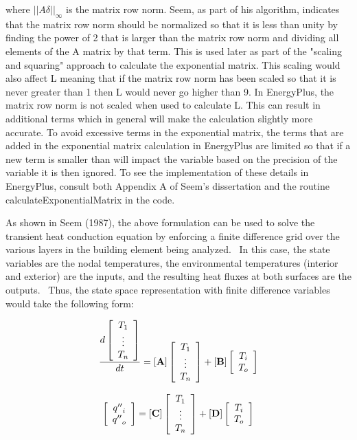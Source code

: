 where \(||A \delta||_\infty\) is the matrix row norm.  Seem, as part of his algorithm, indicates that the matrix row norm should be normalized so that it is less than unity by finding the power of 2 that is larger than the matrix row norm and dividing all elements of the A matrix by that term.  This is used later as part of the "scaling and squaring" approach to calculate the exponential matrix.  This scaling would also affect L meaning that if the matrix row norm has been scaled so that it is never greater than 1 then L would never go higher than 9.  In EnergyPlus, the matrix row norm is not scaled when used to calculate L.  This can result in additional terms which in general will make the calculation slightly more accurate.  To avoid excessive terms in the exponential matrix, the terms that are added in the exponential matrix calculation in EnergyPlus are limited so that if a new term is smaller than will impact the variable based on the precision of the variable it is then ignored.  To see the implementation of these details in EnergyPlus, consult both Appendix A of Seem's dissertation and the routine calculateExponentialMatrix in the code.

As shown in Seem (1987), the above formulation can be used to solve the transient heat conduction equation by enforcing a finite difference grid over the various layers in the building element being analyzed.~ In this case, the state variables are the nodal temperatures, the environmental temperatures (interior and exterior) are the inputs, and the resulting heat fluxes at both surfaces are the outputs.~ Thus, the state space representation with finite difference variables would take the following form:

\begin{equation}
\frac{d\left[\begin{array}{c}T_1 \\ \vdots \\ T_n\end{array}\right]}{dt} = \left[\bf{A}\right]\left[\begin{array}{c}T_1 \\ \vdots \\ T_n\end{array}\right]+\left[\bf{B}\right]\left[\begin{array}{c}T_i \\ T_o\end{array}\right]
\end{equation}

\begin{equation}
\left[\begin{array}{c}{q''}_i \\ {q''}_o\end{array}\right] = \left[\bf{C}\right]\left[\begin{array}{c}T_1 \\ \vdots \\ T_n\end{array}\right]+\left[\bf{D}\right]\left[\begin{array}{c}T_i \\ T_o\end{array}\right]
\end{equation}

